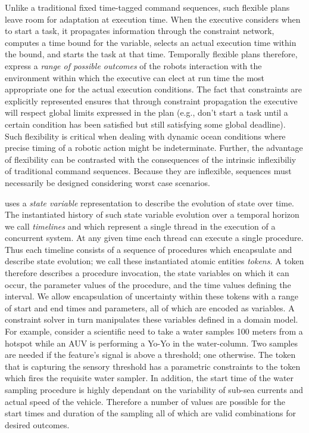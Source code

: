 Unlike a traditional fixed time-tagged command sequences, such
flexible plans leave room for adaptation at execution time. When the
executive considers when to start a task, it propagates information
through the constraint network, computes a time bound for the
variable, selects an actual execution time within the bound, and
starts the task at that time. Temporally flexible plans therefore,
express a \textit{range of possible outcomes} of the robots
interaction with the environment within which the executive can elect
at run time the most appropriate one for the actual execution
conditions. The fact that constraints are explicitly represented
ensures that through constraint propagation the executive will respect
global limits expressed in the plan (e.g., don't start a task until a
certain condition has been satisfied but still satisfying some global
deadline). Such flexibility is critical when dealing with dynamic
ocean conditions where precise timing of a robotic action might be
indeterminate. Further, the advantage of flexibility can be contrasted
with the consequences of the intrinsic inflexibiliy of traditional
command sequences. Because they are inflexible, sequences must
necessarily be designed considering worst case scenarios.

\eu uses a \emph{state variable} representation to describe the
evolution of state over time. The instantiated history of such state
variable evolution over a temporal horizon we call \emph{timelines}
and which represent a single thread in the execution of a concurrent
system. At any given time each thread can execute a single procedure.
Thus each timeline consists of a sequence of procedures which
encapsulate and describe state evolution; we call these instantiated
atomic entities \emph{tokens}.  A token therefore describes a
procedure invocation, the state variables on which it can occur, the
parameter values of the procedure, and the time values defining the
interval. We allow encapsulation of uncertainty within these tokens
with a range of start and end times and parameters, all of which are
encoded as variables. A constraint solver in turn manipulates these
variables defined in a \eu domain model. For example, consider
a scientific need to take a water samples 100 meters from a hotspot
while an AUV is performing a Yo-Yo in the water-column. Two samples
are needed if the feature's signal is above a threshold; one
otherwise. The token that is capturing the sensory threshold has a
parametric constraints to the token which fires the requisite water
sampler. In addition, the start time of the water sampling procedure
is highly dependant on the variability of sub-sea currents and actual
speed of the vehicle. Therefore a number of values are possible for
the start times and duration of the sampling all of which are valid
combinations for desired outcomes.


